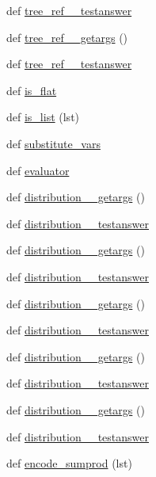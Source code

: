 \begin{DoxyCompactItemize}
\item 
def \hyperlink{namespacetests_a928bd7558436434f9862ebba410e9427}{tree\+\_\+ref\+\_\+\_\+testanswer}
\item 
def \hyperlink{namespacetests_a4c80f266f54128bcd3b64c1a35e66f36}{tree\+\_\+ref\+\_\+\_\+getargs} ()
\item 
def \hyperlink{namespacetests_a6b99d9bd234e2451c3bfb5e4e9d4e364}{tree\+\_\+ref\+\_\+\_\+testanswer}
\item 
def \hyperlink{namespacetests_ab958cc1598bdabeeb6c033573c5e3ae8}{is\+\_\+flat}
\item 
def \hyperlink{namespacetests_a4fcba9f23a2161463013036459ad7f45}{is\+\_\+list} (lst)
\item 
def \hyperlink{namespacetests_afdf16bc16559120167fdbdb22de936ea}{substitute\+\_\+vars}
\item 
def \hyperlink{namespacetests_a1cbefe5deb7865d7c038f8c9f6813d05}{evaluator}
\item 
def \hyperlink{namespacetests_a7481fa4f956eeab5ba4f674f4ae510e6}{distribution\+\_\+\_\+getargs} ()
\item 
def \hyperlink{namespacetests_a95018a446cf83f7c898b4922e7e93905}{distribution\+\_\+\_\+testanswer}
\item 
def \hyperlink{namespacetests_a42a80d902e23fb0ad98652b7399e0616}{distribution\+\_\+\_\+getargs} ()
\item 
def \hyperlink{namespacetests_a9a519840ee91ab17682a487f3803a5b5}{distribution\+\_\+\_\+testanswer}
\item 
def \hyperlink{namespacetests_a9e2f5d2abd4c1060832db2d2a65be3de}{distribution\+\_\+\_\+getargs} ()
\item 
def \hyperlink{namespacetests_ae471bd440b20b495c7105a6d69b3110b}{distribution\+\_\+\_\+testanswer}
\item 
def \hyperlink{namespacetests_af5493611bac369f77d22e50ca107ba9a}{distribution\+\_\+\_\+getargs} ()
\item 
def \hyperlink{namespacetests_a6a2e04353d3db80eea441313226b7bfa}{distribution\+\_\+\_\+testanswer}
\item 
def \hyperlink{namespacetests_adae2818bfe1eb7b26a5d74e8ab4ca246}{distribution\+\_\+\_\+getargs} ()
\item 
def \hyperlink{namespacetests_a76840f87f59b71aefba500b7e14533b6}{distribution\+\_\+\_\+testanswer}
\item 
def \hyperlink{namespacetests_aefa63b8f00176fe145d0541e25e22c51}{encode\+\_\+sumprod} (lst)
\item 

\end{DoxyCompactItemize}
